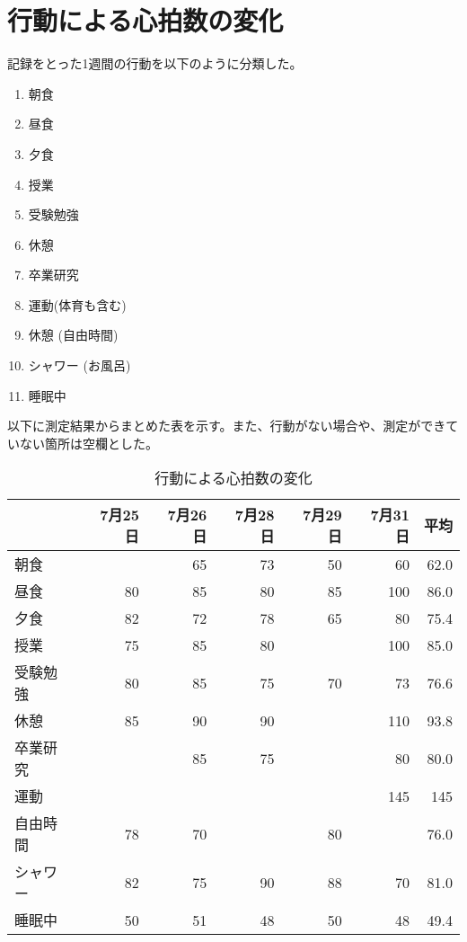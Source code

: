 \documentclass[a4paper,12pt, uplatex, fleqn]{jsarticle}
\begin{document}
\section{行動による心拍数の変化}
    記録をとった1週間の行動を以下のように分類した。
    \begin{enumerate}
        \item 朝食
        \item 昼食
        \item 夕食
        \item 授業
        \item 受験勉強
        \item 休憩
        \item 卒業研究
        \item 運動(体育も含む)
        \item 休憩 (自由時間)
        \item シャワー (お風呂)
        \item 睡眠中
    \end{enumerate}

    以下に測定結果からまとめた表を示す。また、行動がない場合や、測定ができていない箇所は空欄とした。

    \begin{table}[htbp]
        \begin{center}
            \caption{行動による心拍数の変化}
            \begin{tabular}{|l||r|r|r|r|r||r|} \hline
                & 7月25日 & 7月26日 & 7月28日 & 7月29日 & 7月31日 & 平均\\ \hline \hline
                朝食 &  & 65 & 73 & 50 & 60 & 62.0 \\ \hline
                昼食 & 80 & 85 & 80 & 85 & 100 & 86.0 \\ \hline
                夕食 & 82 & 72 & 78 & 65 & 80 & 75.4 \\ \hline
                授業 & 75 & 85 & 80 &  & 100 & 85.0\\ \hline
                受験勉強 & 80 & 85 & 75 & 70 & 73 & 76.6 \\ \hline
                休憩 & 85 & 90 & 90 &  & 110 & 93.8 \\ \hline
                卒業研究 &  & 85 & 75 &  & 80 & 80.0 \\ \hline
                運動 &  &  &  &  & 145 & 145 \\ \hline
                自由時間 & 78 & 70 &  & 80 & & 76.0 \\ \hline
                シャワー & 82 & 75 & 90 & 88 & 70 & 81.0 \\ \hline
                睡眠中 & 50 & 51 & 48 & 50 & 48 & 49.4 \\ \hline
            \end{tabular}
        \end{center}
    \end{table}
    \newpage
\end{document}
